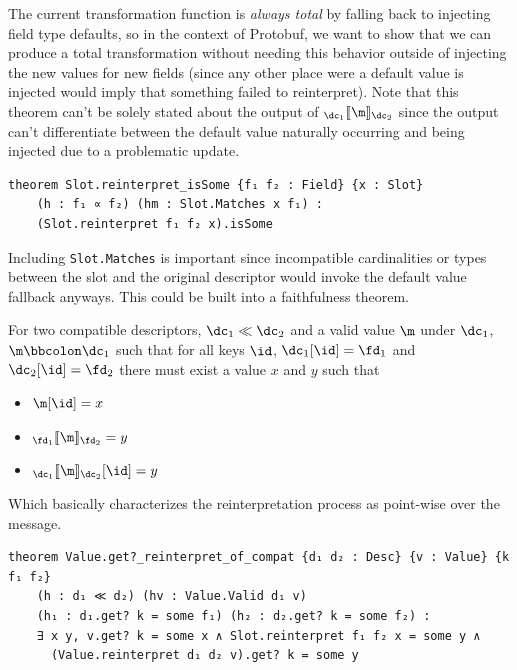 The current transformation function is \emph{always total} by falling back to
injecting field type defaults, so in the context of Protobuf, we want to show
that we can produce a total transformation without needing this behavior outside
of injecting the new values for new fields (since any other place were a default
value is injected would imply that something failed to reinterpret). Note that
this theorem can't be solely stated about the output of
$\coercion{\dc_1}{\m}{\dc_2}$ since the output can't differentiate between the
default value naturally occurring and being injected due to a problematic
update.

\begin{verbatim}
theorem Slot.reinterpret_isSome {f₁ f₂ : Field} {x : Slot}
    (h : f₁ ∝ f₂) (hm : Slot.Matches x f₁) :
    (Slot.reinterpret f₁ f₂ x).isSome
\end{verbatim}

Including \texttt{Slot.Matches} is important since incompatible cardinalities or
types between the slot and the original descriptor would invoke the default
value fallback anyways. This could be built into a faithfulness theorem.

\vspace{1em}
\begin{theorem}[Faithfulness]\label{thm:faith}
  For two compatible descriptors, $\dc_1 \dcompat \dc_2$ and a valid value $\m$ under
  $\dc_1$, $\validv{\m}{\dc_1}$ such that for all keys $\id$, $\dc_1[\id] = \fd_1$ and $\dc_2[\id] =
  \fd_2$ there must exist a value $x$ and $y$ such that
  \begin{itemize}
  \item $\m[\id] = x$
  \item $\coercion{\fd_1}{\m}{\fd_2} = y$
  \item $\coercion{\dc_1}{\m}{\dc_2}[\id] = y$
  \end{itemize}
\end{theorem}

Which basically characterizes the reinterpretation process as point-wise over the
message.

\begin{verbatim}
theorem Value.get?_reinterpret_of_compat {d₁ d₂ : Desc} {v : Value} {k f₁ f₂}
    (h : d₁ ≪ d₂) (hv : Value.Valid d₁ v)
    (h₁ : d₁.get? k = some f₁) (h₂ : d₂.get? k = some f₂) :
    ∃ x y, v.get? k = some x ∧ Slot.reinterpret f₁ f₂ x = some y ∧
      (Value.reinterpret d₁ d₂ v).get? k = some y
\end{verbatim}

